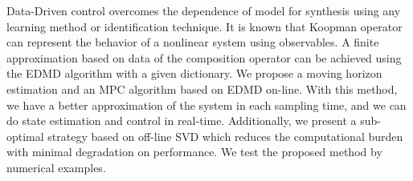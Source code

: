 Data-Driven control overcomes the dependence of model for synthesis using any learning method or identification technique. It is known that Koopman operator can represent the behavior of a nonlinear system using observables. A finite approximation based on data of the composition operator can be achieved using the EDMD algorithm with a given dictionary. We propose a moving horizon estimation and an MPC algorithm based on EDMD on-line. With this method, we have a better approximation of the system in each sampling time, and we can do state estimation and control in real-time. Additionally, we present a sub-optimal strategy based on off-line SVD which reduces the computational burden with minimal degradation on performance. We test the proposed method by numerical examples.  
